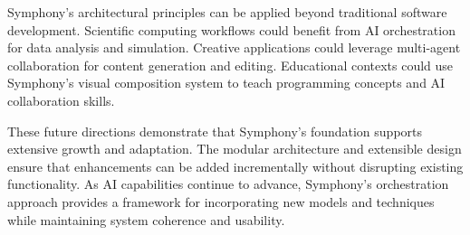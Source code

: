 Symphony's architectural principles can be applied beyond traditional software development. Scientific computing workflows could benefit from AI orchestration for data analysis and simulation. Creative applications could leverage multi-agent collaboration for content generation and editing. Educational contexts could use Symphony's visual composition system to teach programming concepts and AI collaboration skills.

These future directions demonstrate that Symphony's foundation supports extensive growth and adaptation. The modular architecture and extensible design ensure that enhancements can be added incrementally without disrupting existing functionality. As AI capabilities continue to advance, Symphony's orchestration approach provides a framework for incorporating new models and techniques while maintaining system coherence and usability.
